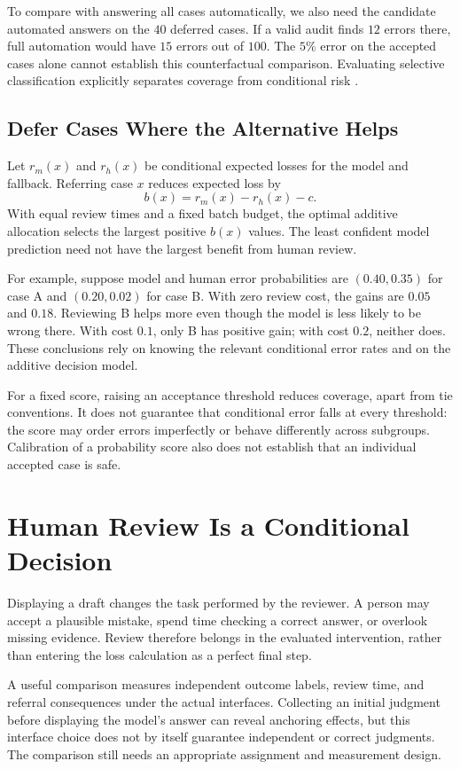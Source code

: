 To compare with answering all cases automatically, we also need the candidate automated answers on the $40$ deferred cases. If a valid audit finds $12$ errors there, full automation would have $15$ errors out of $100$. The $5\%$ error on the accepted cases alone cannot establish this counterfactual comparison. Evaluating selective classification explicitly separates coverage from conditional risk \citep{geifman2017}.

\subsection{Defer Cases Where the Alternative Helps}

Let $r_m(x)$ and $r_h(x)$ be conditional expected losses for the model and fallback. Referring case $x$ reduces expected loss by
\[
b(x)=r_m(x)-r_h(x)-c.
\]
With equal review times and a fixed batch budget, the optimal additive allocation selects the largest positive $b(x)$ values. The least confident model prediction need not have the largest benefit from human review.

For example, suppose model and human error probabilities are $(0.40,0.35)$ for case A and $(0.20,0.02)$ for case B. With zero review cost, the gains are $0.05$ and $0.18$. Reviewing B helps more even though the model is less likely to be wrong there. With cost $0.1$, only B has positive gain; with cost $0.2$, neither does. These conclusions rely on knowing the relevant conditional error rates and on the additive decision model.

For a fixed score, raising an acceptance threshold reduces coverage, apart from tie conventions. It does not guarantee that conditional error falls at every threshold: the score may order errors imperfectly or behave differently across subgroups. Calibration of a probability score also does not establish that an individual accepted case is safe.

\section{Human Review Is a Conditional Decision}

Displaying a draft changes the task performed by the reviewer. A person may accept a plausible mistake, spend time checking a correct answer, or overlook missing evidence. Review therefore belongs in the evaluated intervention, rather than entering the loss calculation as a perfect final step.

A useful comparison measures independent outcome labels, review time, and referral consequences under the actual interfaces. Collecting an initial judgment before displaying the model's answer can reveal anchoring effects, but this interface choice does not by itself guarantee independent or correct judgments. The comparison still needs an appropriate assignment and measurement design.

